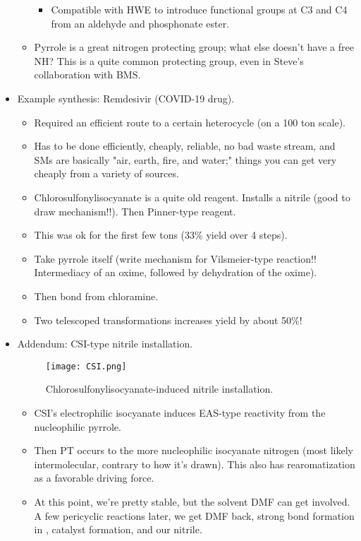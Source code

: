 \documentclass[../notes.tex]{subfiles}
\begin{document}
\begin{itemize}
\begin{itemize}
\begin{itemize}
            \item Compatible with HWE to introduce functional groups at C3 and C4 from an aldehyde and phosphonate ester.
        \end{itemize}
        \item Pyrrole is a great nitrogen protecting group; what else doesn't have a free NH? This is a quite common protecting group, even in Steve's collaboration with BMS.
    \end{itemize}
    \item Example synthesis: Remdesivir (COVID-19 drug).
    \begin{itemize}
        \item Required an efficient route to a certain heterocycle (on a 100 ton scale).
        \item Has to be done efficiently, cheaply, reliable, no bad waste stream, and SMs are basically "air, earth, fire, and water;" things you can get very cheaply from a variety of sources.
        \item Chlorosulfonylisocyanate is a quite old reagent. Installs a nitrile (good to draw mechanism!!). Then Pinner-type reagent.
        \item This was ok for the first few tons (33\% yield over 4 steps).
        \item Take pyrrole itself (write mechanism for Vilsmeier-type reaction!! Intermediacy of an oxime, followed by dehydration of the oxime).
        \item Then  bond from chloramine.
        \item Two telescoped transformations increases yield by about 50\%!
    \end{itemize}
    \item Addendum: CSI-type nitrile installation.
    \begin{figure}[h!]
        \centering
        \texttt{[image: CSI.png]}
        \caption{Chlorosulfonylisocyanate-induced nitrile installation.}
        \label{fig:CSI}
    \end{figure}
    \begin{itemize}
        \item CSI's electrophilic isocyanate induces EAS-type reactivity from the nucleophilic pyrrole.
        \item Then PT occurs to the more nucleophilic isocyanate nitrogen (most likely intermolecular, contrary to how it's drawn). This also has rearomatization as a favorable driving force.
        \item At this point, we're pretty stable, but the solvent DMF can get involved. A few pericyclic reactions later, we get DMF back, strong  bond formation in ,  catalyst formation, and our nitrile.

\end{itemize}
\end{itemize}
\end{document}
